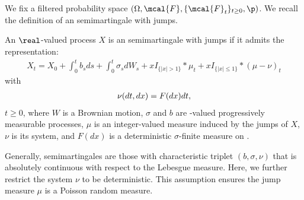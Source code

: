 We fix a filtered probability space $(\Omega, \mcal{F}, \{\mcal{F}_t\}_{t \ge 0}, \p)$. We recall the definition of an \ito semimartingale with \levy jumps.  
\begin{defn}
  An $\real$-valued process $X$ is an \ito semimartingale with \levy jumps if it admits the representation:
  \begin{align}
    X_t = X_0 + \int^t_0 b_s ds + \int^t_0 \sigma_s d W_s  + x  I_{\{\vert x \vert > 1\}} \ast \mu_t  + x  I_{\{\vert x \vert \le  1\}} \ast (\mu - \nu)_t 
    \label{eq:semimartingale}
  \end{align}
  with 
  \begin{align}
    \nu(dt, dx) = F(dx) dt, \notag
    \label{}
  \end{align}
  $t \ge 0$, where $W$ is a Brownian motion, $\sigma$ and $b$ are \real-valued progressively measurable processes, $\mu$ is an integer-valued measure induced by the jumps  of $X$, $\nu$ is its \levy system, and $F(dx)$ is a  deterministic $\sigma$-finite measure on \real. 
\end{defn}
\begin{remark}
  Generally, \ito semimartingales are those with characteristic triplet $(b, \sigma, \nu)$ that is absolutely continuous with respect to the Lebesgue measure. Here, we further restrict the \levy system $\nu$ to be deterministic. This assumption ensures the jump measure $\mu$ is a Poisson random measure. 
\end{remark}

